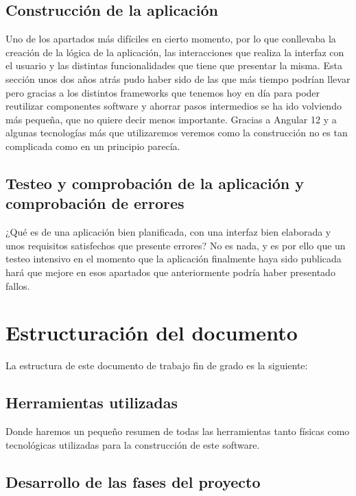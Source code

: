 \subsection{Construcción de la aplicación}

Uno de los apartados más difíciles en cierto momento, por lo que conllevaba la creación de la lógica de la aplicación, las interacciones que realiza la interfaz con el usuario y las distintas funcionalidades que tiene que presentar la misma. Esta sección unos dos años atrás pudo haber sido de las que más tiempo podrían llevar pero gracias a los distintos frameworks que tenemos hoy en día para poder reutilizar componentes software y ahorrar pasos intermedios se ha ido volviendo más pequeña, que no quiere decir menos importante. Gracias a Angular 12 y a algunas tecnologías más que utilizaremos veremos como la construcción no es tan complicada como en un principio parecía.

\subsection{Testeo y comprobación de la aplicación y comprobación de errores}

¿Qué es de una aplicación bien planificada, con una interfaz bien elaborada y unos requisitos satisfechos que presente errores? No es nada, y es por ello que un testeo intensivo en el momento que la aplicación finalmente haya sido publicada hará que mejore en esos apartados que anteriormente podría haber presentado fallos.


\section{Estructuración del documento}

La estructura de este documento de trabajo fin de grado es la siguiente:

\subsection{Herramientas utilizadas}

Donde haremos un pequeño resumen de todas las herramientas tanto físicas como tecnológicas utilizadas para la construcción de este software.

\subsection{Desarrollo de las fases del proyecto}

